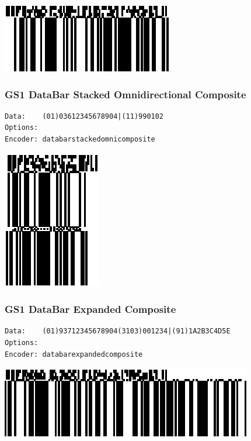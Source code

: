 \includegraphics{images/databaromnicomposite-1.eps}

\hypertarget{gs1-databar-stacked-omnidirectional-composite}{%
\subsubsection{GS1 DataBar Stacked Omnidirectional
Composite}\label{gs1-databar-stacked-omnidirectional-composite}}

\begin{verbatim}
Data:    (01)03612345678904|(11)990102
Options: 
Encoder: databarstackedomnicomposite
\end{verbatim}

\includegraphics{images/databarstackedomnicomposite-1.eps}

\hypertarget{gs1-databar-expanded-composite}{%
\subsubsection{GS1 DataBar Expanded
Composite}\label{gs1-databar-expanded-composite}}

\begin{verbatim}
Data:    (01)93712345678904(3103)001234|(91)1A2B3C4D5E
Options: 
Encoder: databarexpandedcomposite
\end{verbatim}

\includegraphics{images/databarexpandedcomposite-1.eps}

